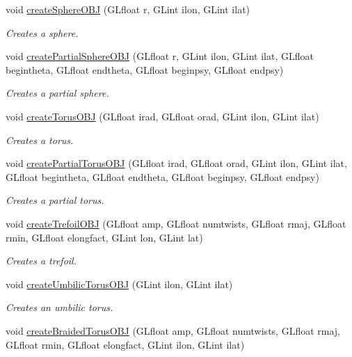 \begin{DoxyCompactItemize}
void \hyperlink{class_models_a815ab35b893796d6d214f1bc68588dc1}{create\+Sphere\+O\+BJ} (G\+Lfloat r, G\+Lint ilon, G\+Lint ilat)
\begin{DoxyCompactList}\small\item\em Creates a sphere. \end{DoxyCompactList}\item 
void \hyperlink{class_models_af9e1eef42ba62fffd95359811f540287}{create\+Partial\+Sphere\+O\+BJ} (G\+Lfloat r, G\+Lint ilon, G\+Lint ilat, G\+Lfloat begintheta, G\+Lfloat endtheta, G\+Lfloat beginpsy, G\+Lfloat endpsy)
\begin{DoxyCompactList}\small\item\em Creates a partial sphere. \end{DoxyCompactList}\item 
void \hyperlink{class_models_a95f0ccb59a00210e0f8cc683f15cf1e2}{create\+Torus\+O\+BJ} (G\+Lfloat irad, G\+Lfloat orad, G\+Lint ilon, G\+Lint ilat)
\begin{DoxyCompactList}\small\item\em Creates a torus. \end{DoxyCompactList}\item 
void \hyperlink{class_models_a61ce3d8672c6593f28c2be44b3a67201}{create\+Partial\+Torus\+O\+BJ} (G\+Lfloat irad, G\+Lfloat orad, G\+Lint ilon, G\+Lint ilat, G\+Lfloat begintheta, G\+Lfloat endtheta, G\+Lfloat beginpsy, G\+Lfloat endpsy)
\begin{DoxyCompactList}\small\item\em Creates a partial torus. \end{DoxyCompactList}\item 
void \hyperlink{class_models_a227641d74dbb3f535da1ed5869b94804}{create\+Trefoil\+O\+BJ} (G\+Lfloat amp, G\+Lfloat numtwists, G\+Lfloat rmaj, G\+Lfloat rmin, G\+Lfloat elongfact, G\+Lint lon, G\+Lint lat)
\begin{DoxyCompactList}\small\item\em Creates a trefoil. \end{DoxyCompactList}\item 
void \hyperlink{class_models_ab14e5a0994902113c4a104d97924b3a3}{create\+Umbilic\+Torus\+O\+BJ} (G\+Lint ilon, G\+Lint ilat)
\begin{DoxyCompactList}\small\item\em Creates an umbilic torus. \end{DoxyCompactList}\item 
void \hyperlink{class_models_a4f35e25b5362120188dab01cd3e146cd}{create\+Braided\+Torus\+O\+BJ} (G\+Lfloat amp, G\+Lfloat numtwists, G\+Lfloat rmaj, G\+Lfloat rmin, G\+Lfloat elongfact, G\+Lint ilon, G\+Lint ilat)

\end{DoxyCompactItemize}
